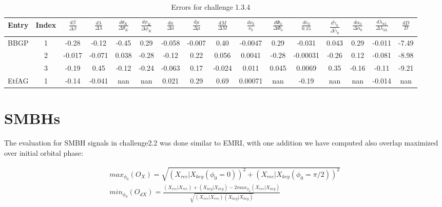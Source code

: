 \documentclass[prd,aps,amsfonts,amsmath, nofootinbib]{revtex4}
\def\bea{\begin{eqnarray}}
\def\ena{\end{eqnarray}}
\begin{document}
\begin{table}
\caption{\label{EMRI_err} Errors for challenge 1.3.4}
\begin{ruledtabular}
\begin{tabular}{|c|c|c|c|c|c|c|c|c|c|c|c|c|c|c|c|}
Entry & Index & $\frac{d\beta}{\Delta\beta}$ & 
$\frac{d\lambda}{\Delta\lambda}$ &
 $\frac{d\theta_K}{\Delta\theta_K}$ & $\frac{d\phi_K}{\Delta\phi_K}$ 
 & $\frac{da}{\Delta a}$ & $\frac{d\mu}{\Delta\mu}$ & 
 $\frac{dM}{\Delta M}$ &  $\frac{d\nu_0}{\nu_0}$ & 
 $\frac{d\Phi_0}{\Delta\Phi_0}$ &  $\frac{de_0}{0.15}$ & 
 $\frac{d\tilde{\gamma}_0}{\Delta\tilde{\gamma}_0}$ &
 $\frac{d\alpha_0}{\Delta\alpha_0}$ & 
 $\frac{d\lambda_{SL}}{\Delta\lambda_{SL}}$ &
  $\frac{dD}{D}$ \\ 
\hline
 BBGP &  1 & 
 -0.28   &   -0.12   &   -0.45   &   0.29   &   -0.058   &   -0.007   &   0.40   &   -0.0047   &   0.29  &   -0.031   &   0.043   &   0.29   &   -0.011  &   -7.49  \\   
   & 2 &
 -0.017  &   -0.071 &   0.038   &   -0.28   &   -0.12   &   0.22   &   0.056  &   0.0041   &   -0.28   &   -0.00031  &   -0.26   &   0.12 &   -0.081   &   -8.98   \\  
   & 3 &
 -0.19   &   0.45   &   -0.12   &   -0.24   &   -0.063   &   0.17   &   -0.024  &   0.011   &   0.045   &   0.0069   &   0.35   &   -0.16   &   -0.11   &   -9.21   \\  
\hline
EtfAG & 1&
 -0.14   &   -0.041   &   nan   &   nan   &   0.021  &   0.29   &   0.69   &   0.00071   &   nan   &   -0.19   &   nan   &   nan   &   -0.014   &   nan   \\  
\hline 
\end{tabular}
\end{ruledtabular}
\end{table}


\section{SMBHs}

The evaluation for SMBH signals in challenge2.2 was done similar to EMRI,
with one addition we have computed also overlap maximized over initial 
orbital phase:

\bea
max_{\phi_0}(O_X) = \sqrt{(X_{rec}|X_{key}(\phi_0 = 0))^2 +
(X_{rec}|X_{key}(\phi_0 = \pi/2))^2}\\
min_{\phi_0}(O_{dX}) = \frac{ (X_{rec}|X_{rec}) + (X_{key}|X_{key}) -
2 max_{\phi_0}(X_{rec}|X_{key})}{\sqrt{(X_{rec}|X_{rec})(X_{key}|X_{key})}}
\ena
\end{document}

